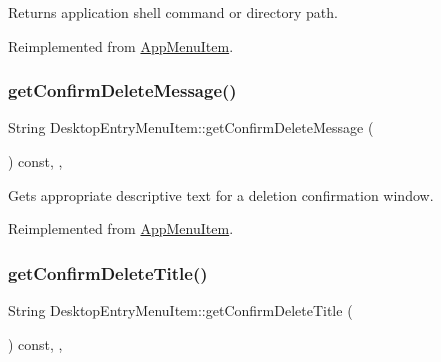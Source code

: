 \begin{DoxyReturn}{Returns}
application shell command or directory path. 
\end{DoxyReturn}


Reimplemented from \mbox{\hyperlink{classAppMenuItem_ab56357ca864c4cedc9caed1118498670}{App\+Menu\+Item}}.

\mbox{\label{classDesktopEntryMenuItem_ae08d54a981ea02f2fcac9a8aba51e65f}} 
\subsubsection{\texorpdfstring{get\+Confirm\+Delete\+Message()}{getConfirmDeleteMessage()}}
{\footnotesize\ttfamily String Desktop\+Entry\+Menu\+Item\+::get\+Confirm\+Delete\+Message (\begin{DoxyParamCaption}{ }\end{DoxyParamCaption}) const\hspace{0.3cm}{\ttfamily [override]}, {\ttfamily [protected]}, {\ttfamily [virtual]}}

Gets appropriate descriptive text for a deletion confirmation window. 

Reimplemented from \mbox{\hyperlink{classAppMenuItem_ac5922f3ac33054ecd54bb3fab692d639}{App\+Menu\+Item}}.

\mbox{\label{classDesktopEntryMenuItem_a4ec791310ca94a2e9e5d3fab24656502}} 
\subsubsection{\texorpdfstring{get\+Confirm\+Delete\+Title()}{getConfirmDeleteTitle()}}
{\footnotesize\ttfamily String Desktop\+Entry\+Menu\+Item\+::get\+Confirm\+Delete\+Title (\begin{DoxyParamCaption}{ }\end{DoxyParamCaption}) const\hspace{0.3cm}{\ttfamily [override]}, {\ttfamily [protected]}, {\ttfamily [virtual]}}

